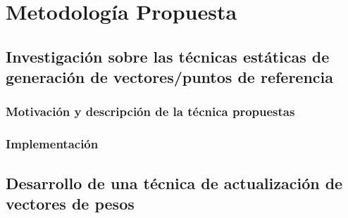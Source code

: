\chapter{Metodología  Propuesta}

\section{Investigación sobre las técnicas estáticas de generación de vectores/puntos de referencia}


\subsection{Motivación y descripción de la técnica  propuestas}

\subsection{Implementación}

\section{Desarrollo de una técnica de actualización de vectores de pesos}